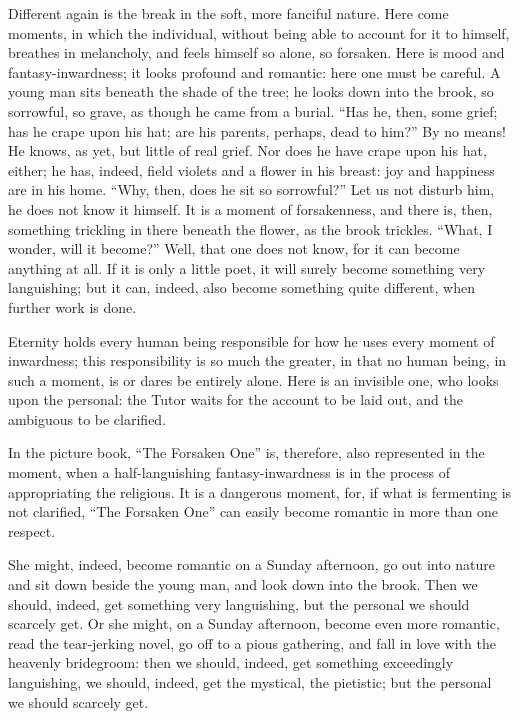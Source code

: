 \documentclass[12pt,a4paper]{book}
\begin{document}
Different again is the break in the soft, more fanciful nature. Here come moments, in which the individual, without being able to account for it to himself, breathes in melancholy, and feels himself so alone, so forsaken. Here is mood and fantasy-inwardness; it looks profound and romantic: here one must be careful.
A young man sits beneath the shade of the tree; he looks down into the brook, so sorrowful, so grave, as though he came from a burial. ``Has he, then, some grief; has he crape upon his hat; are his parents, perhaps, dead to him?'' By no means! He knows, as yet, but little of real grief. Nor does he have crape upon his hat, either; he has, indeed, field violets and a flower in his breast: joy and happiness are in his home. ``Why, then, does he sit so sorrowful?'' Let us not disturb him, he does not know it himself. It is a moment of forsakenness, and there is, then, something trickling in there beneath the flower, as the brook trickles. ``What, I wonder, will it become?'' Well, that one does not know, for it can become anything at all. If it is only a little poet, it will surely become something very languishing; but it can, indeed, also become something quite different, when further work is done.

Eternity holds every human being responsible for how he uses every moment of inwardness; this responsibility is so much the greater, in that no human being, in such a moment, is or dares be entirely alone. Here is an invisible one, who looks upon the personal: the Tutor waits for the account to be laid out, and the ambiguous to be clarified.

In the picture book, ``The Forsaken One'' is, therefore, also represented in the moment, when a half-languishing fantasy-inwardness is in the process of appropriating the religious. It is a dangerous moment, for, if what is fermenting is not clarified, ``The Forsaken One'' can easily become romantic in more than one respect.

She might, indeed, become romantic on a Sunday afternoon, go out into nature and sit down beside the young man, and look down into the brook. Then we should, indeed, get something very languishing, but the personal we should scarcely get. Or she might, on a Sunday
afternoon, become even more romantic, read the tear-jerking novel, go off to a pious gathering, and fall in love with the heavenly bridegroom: then we should, indeed, get something exceedingly languishing, we should, indeed, get the mystical, the pietistic; but the personal we should scarcely get.
\end{document}
